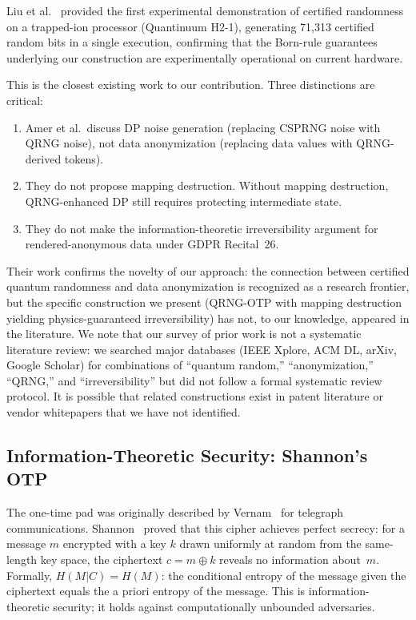\documentclass[journal]{IEEEtran}
\begin{document}
Liu et al.~\cite{liu2025certified} provided the first experimental demonstration of certified randomness on a trapped-ion processor (Quantinuum H2-1), generating 71,313 certified random bits in a single execution, confirming that the Born-rule guarantees underlying our construction are experimentally operational on current hardware.

This is the closest existing work to our contribution. Three distinctions are critical:
\begin{enumerate}
\item Amer et al.\ discuss DP noise generation (replacing CSPRNG noise with QRNG noise), not data anonymization (replacing data values with QRNG-derived tokens).
\item They do not propose mapping destruction. Without mapping destruction, QRNG-enhanced DP still requires protecting intermediate state.
\item They do not make the information-theoretic irreversibility argument for rendered-anonymous data under GDPR Recital~26.
\end{enumerate}

Their work confirms the novelty of our approach: the connection between certified quantum randomness and data anonymization is recognized as a research frontier, but the specific construction we present (QRNG-OTP with mapping destruction yielding physics-guaranteed irreversibility) has not, to our knowledge, appeared in the literature. We note that our survey of prior work is not a systematic literature review: we searched major databases (IEEE Xplore, ACM DL, arXiv, Google Scholar) for combinations of ``quantum random,'' ``anonymization,'' ``QRNG,'' and ``irreversibility'' but did not follow a formal systematic review protocol. It is possible that related constructions exist in patent literature or vendor whitepapers that we have not identified.

\subsection{Information-Theoretic Security: Shannon's OTP}
\label{subsec:it_security}

The one-time pad was originally described by Vernam~\cite{vernam1926cipher} for telegraph communications. Shannon~\cite{shannon1949secrecy} proved that this cipher achieves perfect secrecy: for a message $m$ encrypted with a key $k$ drawn uniformly at random from the same-length key space, the ciphertext $c = m \oplus k$ reveals no information about~$m$. Formally, $H(M | C) = H(M)$: the conditional entropy of the message given the ciphertext equals the a priori entropy of the message. This is information-theoretic security; it holds against computationally unbounded adversaries.
\end{document}
